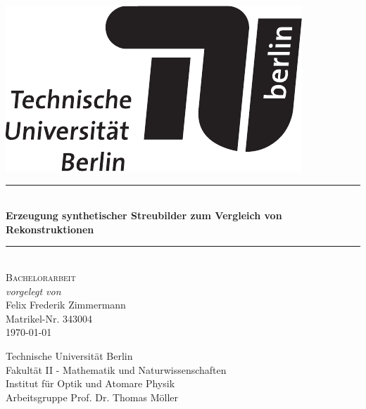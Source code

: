 \begin{titlepage}

\begin{center}


\begin{flushright}
\includegraphics[width=.3\textwidth]{./images/TU_Logo.pdf}\\[2.5cm]    
\end{flushright}




\newcommand{\HRule}{\rule{\linewidth}{0.5mm}}
\HRule \\[0.4cm]
{ \huge \bfseries Erzeugung synthetischer Streubilder zum Vergleich von Rekonstruktionen}\\[0.4cm]

\HRule \\[1.5cm]

\textsc{\Large Bachelorarbeit}\\[0.5cm]

\emph{vorgelegt von}\\
Felix Frederik Zimmermann\\
Matrikel-Nr. 343004\\[0.5cm]
{\large \today}


\vfill

Technische Universität Berlin\\
Fakultät II - Mathematik und Naturwissenschaften\\
Institut für Optik und Atomare Physik\\
Arbeitsgruppe Prof. Dr. Thomas Möller\\

\end{center}

\end{titlepage}